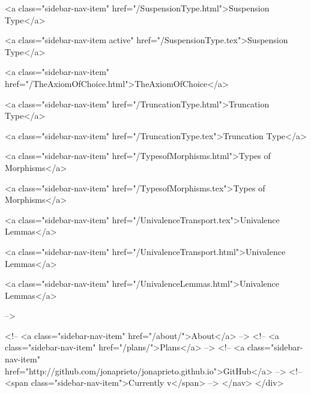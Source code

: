       
    
      
        
          <a class="sidebar-nav-item" href="/SuspensionType.html">Suspension Type</a>
        
      
    
      
        
          <a class="sidebar-nav-item active" href="/SuspensionType.tex">Suspension Type</a>
        
      
    
      
        
          <a class="sidebar-nav-item" href="/TheAxiomOfChoice.html">TheAxiomOfChoice</a>
        
      
    
      
        
          <a class="sidebar-nav-item" href="/TruncationType.html">Truncation Type</a>
        
      
    
      
        
          <a class="sidebar-nav-item" href="/TruncationType.tex">Truncation Type</a>
        
      
    
      
        
          <a class="sidebar-nav-item" href="/TypesofMorphisms.html">Types of Morphisms</a>
        
      
    
      
        
          <a class="sidebar-nav-item" href="/TypesofMorphisms.tex">Types of Morphisms</a>
        
      
    
      
        
          <a class="sidebar-nav-item" href="/UnivalenceTransport.tex">Univalence Lemmas</a>
        
      
    
      
        
          <a class="sidebar-nav-item" href="/UnivalenceTransport.html">Univalence Lemmas</a>
        
      
    
      
        
          <a class="sidebar-nav-item" href="/UnivalenceLemmas.html">Univalence Lemmas</a>
        
      
     -->

    <!-- <a class="sidebar-nav-item" href="/about/">About</a> -->
    <!-- <a class="sidebar-nav-item" href="/plans/">Plans</a> -->
    <!-- <a class="sidebar-nav-item" href="http://github.com/jonaprieto/jonaprieto.github.io">GitHub</a> -->
    <!-- <span class="sidebar-nav-item">Currently v</span> -->
  </nav>
</div>


